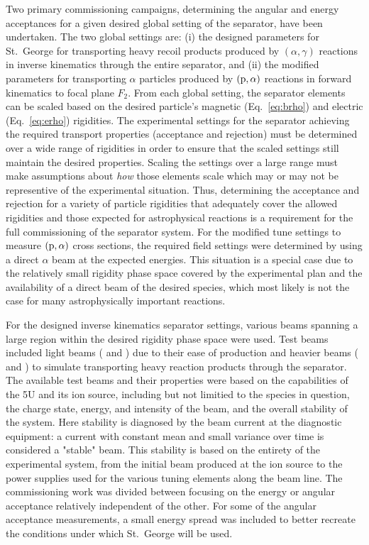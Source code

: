 Two primary commissioning campaigns, determining the angular and energy
acceptances for a given desired global setting of the separator, have
been undertaken. The two global settings are: (i) the designed
parameters for St.\ George for transporting heavy recoil products
produced by $(\alpha,\gamma)$ reactions in inverse kinematics through
the entire separator, and (ii) the modified parameters for transporting
$\alpha$ particles produced by $({\rm p},\alpha)$ reactions in forward
kinematics to focal plane $F_2$. From each global setting, the separator
elements can be scaled based on the desired particle's magnetic
(Eq.~\ref{eq:brho}) and electric (Eq.~\ref{eq:erho}) rigidities. The
experimental settings for the separator achieving the required transport
properties (acceptance and rejection) must be determined over a wide
range of rigidities in order to ensure that the scaled settings still
maintain the desired properties. Scaling the settings over a large range
must make assumptions about \emph{how} those elements scale which may or
may not be representive of the experimental situation. Thus, determining
the acceptance and rejection for a variety of particle rigidities that
adequately cover the allowed rigidities and those expected for
astrophysical reactions is a requirement for the full commissioning of
the separator system. For the modified tune settings to measure $({\rm
p},\alpha)$ cross sections, the required field settings were determined
by using a direct $\alpha$ beam at the expected energies. This situation
is a special case due to the relatively small rigidity phase space
covered by the experimental plan and the availability of a direct beam
of the desired species, which most likely is not the case for many
astrophysically important reactions.

For the designed inverse kinematics separator settings, various beams
spanning a large region within the desired rigidity phase space were
used. Test beams included light beams ( and ) due
to their ease of production and heavier beams ( and
) to simulate transporting heavy reaction products through
the separator. The available test beams and their properties were based
on the capabilities of the 5U and its ion source, including but not
limitied to the species in question, the charge state, energy, and
intensity of the beam, and the overall stability of the system. Here
stability is diagnosed by the beam current at the diagnostic equipment:
a current with constant mean and small variance over time is considered
a "stable" beam. This stability is based on the entirety of the
experimental system, from the initial beam produced at the ion source to
the power supplies used for the various tuning elements along the beam
line. The commissioning work was divided between focusing on the energy
or angular acceptance relatively independent of the other. For some of
the angular acceptance measurements, a small energy spread was included
to better recreate the conditions under which St.\ George will be used.


